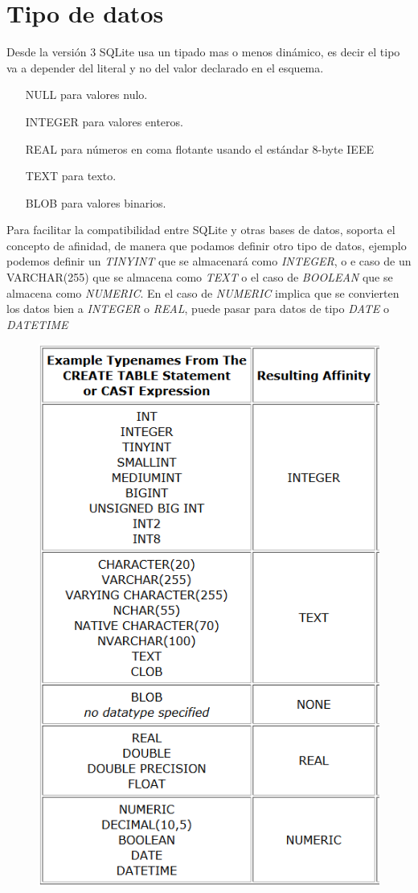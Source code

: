 \documentclass[4paper]{article}
\begin{document}
\section{Tipo de datos}
Desde la versión 3 SQLite usa un tipado mas o menos dinámico, es decir el tipo va a depender del literal y no del valor declarado en el esquema. 
\begin{enumerate}
\item[NULL] para valores nulo.
\item[INTEGER] para valores enteros.
\item[REAL] para números en coma flotante usando el estándar 8-byte IEEE
\item[TEXT] para texto.
\item[BLOB] para valores binarios.
\end{enumerate}
Para facilitar la compatibilidad entre SQLite y otras bases de datos, soporta el concepto de afinidad, de manera que podamos definir otro tipo de datos, ejemplo podemos definir un \emph{TINYINT} que se almacenará como \emph{INTEGER}, o e caso de un VARCHAR(255) que se almacena como \emph{TEXT} o el caso de \emph{BOOLEAN} que se almacena como \emph{NUMERIC}. En el caso de \emph{NUMERIC} implica que se convierten los datos bien a \emph{INTEGER} o \emph{REAL}, puede pasar para datos de tipo \emph{DATE} o \emph{DATETIME}
\begin{figure}[H]
\centering
\includegraphics[scale=0.5]{afinidad.png}
\end{figure}
\end{document}
